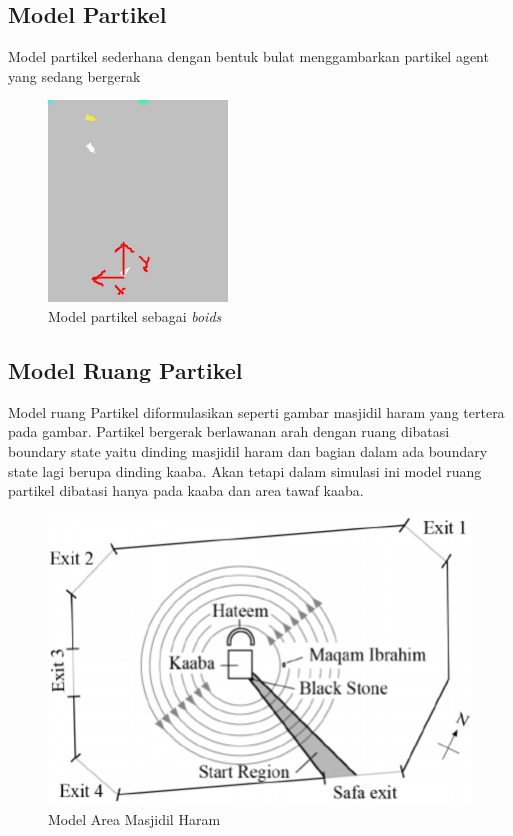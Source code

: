 \subsection{Model Partikel}\label{sec:modelpartikel}
\hspace {0.5cm}Model partikel sederhana dengan bentuk bulat menggambarkan partikel agent yang sedang bergerak
\begin{figure}
\centering
\includegraphics[scale=0.6]{gambar/modelboids2}
\caption{Model partikel sebagai \emph{boids}}
\end{figure}


\subsection{Model Ruang Partikel}\label{sec:ruangpartikel}

\hspace {0.5cm}Model ruang Partikel diformulasikan seperti gambar masjidil haram yang tertera pada gambar. Partikel bergerak berlawanan arah dengan ruang dibatasi boundary state yaitu dinding masjidil haram dan bagian dalam ada boundary state lagi berupa dinding kaaba. Akan tetapi dalam simulasi ini model ruang partikel dibatasi hanya pada kaaba dan area tawaf kaaba.
\begin{figure}
\centering
\includegraphics[scale=0.4]{gambar/layout2dmasjidilharam}
\caption{Model Area Masjidil Haram}
\end{figure}

